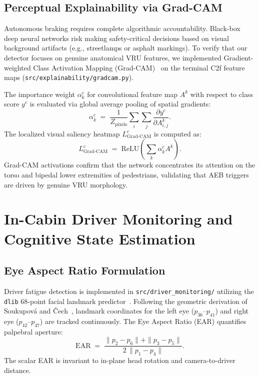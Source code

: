 \documentclass[3p,twocolumn]{elsarticle}
\begin{document}
\subsection{Perceptual Explainability via Grad-CAM}
Autonomous braking requires complete algorithmic accountability. Black-box deep neural networks risk making safety-critical decisions based on visual background artifacts (e.g., streetlamps or asphalt markings). To verify that our detector focuses on genuine anatomical VRU features, we implemented Gradient-weighted Class Activation Mapping (Grad-CAM)~\cite{selvaraju2017} on the terminal C2f feature maps (\texttt{src/explainability/gradcam.py}).

The importance weight $\alpha_k^c$ for convolutional feature map $A^k$ with respect to class score $y^c$ is evaluated via global average pooling of spatial gradients:
\begin{equation}
  \alpha_k^c \;=\; \frac{1}{Z_{\text{pixels}}} \sum_{i} \sum_{j} \frac{\partial y^c}{\partial A_{i,j}^k}.
  \label{eq:gradcam_weights}
\end{equation}
The localized visual saliency heatmap $L_{\text{Grad-CAM}}^c$ is computed as:
\begin{equation}
  L_{\text{Grad-CAM}}^c \;=\; \text{ReLU}\left( \sum_k \alpha_k^c A^k \right).
  \label{eq:gradcam_map}
\end{equation}
Grad-CAM activations confirm that the network concentrates its attention on the torso and bipedal lower extremities of pedestrians, validating that AEB triggers are driven by genuine VRU morphology.

\section{In-Cabin Driver Monitoring and Cognitive State Estimation}
\label{sec:driver_monitoring}

\subsection{Eye Aspect Ratio Formulation}
Driver fatigue detection is implemented in \texttt{src/driver\_monitoring/} utilizing the \texttt{dlib} 68-point facial landmark predictor~\cite{king2009}. Following the geometric derivation of Soukupov\'a and \v{C}ech~\cite{soukupova2016}, landmark coordinates for the left eye ($p_{36}$--$p_{41}$) and right eye ($p_{42}$--$p_{47}$) are tracked continuously. The Eye Aspect Ratio (EAR) quantifies palpebral aperture:
\begin{equation}
  \text{EAR} \;=\; \frac{\|p_2 - p_6\| + \|p_3 - p_5\|}{2\,\|p_1 - p_4\|}.
  \label{eq:ear}
\end{equation}
The scalar EAR is invariant to in-plane head rotation and camera-to-driver distance.
\end{document}
